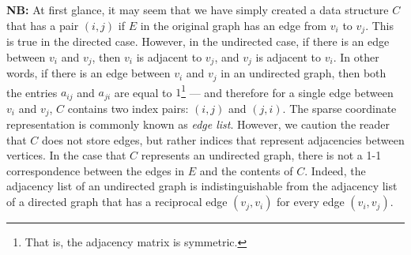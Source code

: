 \textbf{NB:} At first glance, it may seem that we have simply created a data structure $C$ that has a pair $(i,j)$ if $E$ in the
original graph has an edge from $v_i$ to $v_j$.  This is true in the directed case.  However, in the undirected case, if there is an edge between $v_i$ and $v_j$, then $v_i$ is adjacent to $v_j$, and $v_j$ is adjacent to $v_i$.  In other words, if there is an edge between $v_i$ and  $v_j$ in an undirected graph, then both the entries $a_{ij}$ and $a_{ji}$ are equal to $1$\footnote{That is, the adjacency matrix is symmetric.} --- and therefore for a single edge between $v_i$ and $v_j$,  $C$ contains two index pairs: $(i, j)$  and $(j, i)$.   The sparse coordinate representation is commonly known as \emph{edge list}.  However, we caution the reader that $C$ does not store edges, but rather indices that represent adjacencies between vertices.  In the case that $C$ represents an undirected graph, there is not a 1-1 correspondence between the edges in $E$ and the contents of $C$.
Indeed, the adjacency list of an undirected graph is indistinguishable from the adjacency list of a directed graph that has a reciprocal edge $(v_j, v_i)$ for every edge $(v_i, v_j)$.

